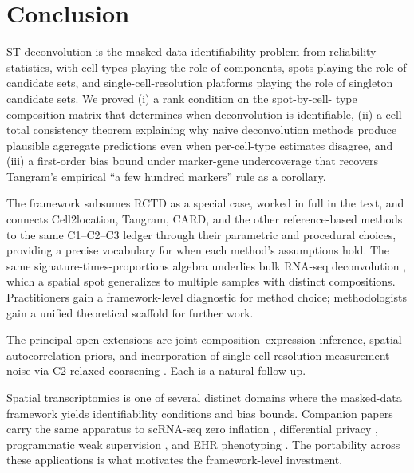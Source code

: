 \section{Conclusion}
\label{sec:conclusion}

ST deconvolution is the masked-data identifiability problem from
reliability statistics, with cell types playing the role of
components, spots playing the role of candidate sets, and
single-cell-resolution platforms playing the role of singleton
candidate sets. We proved (i) a rank condition on the spot-by-cell-
type composition matrix that determines when deconvolution is
identifiable, (ii) a cell-total consistency theorem explaining why
naive deconvolution methods produce plausible aggregate predictions
even when per-cell-type estimates disagree, and (iii) a first-order
bias bound under marker-gene undercoverage that recovers Tangram's
empirical ``a few hundred markers'' rule as a corollary.

The framework subsumes RCTD as a special case, worked in full in the
text, and connects Cell2location, Tangram, CARD, and the other
reference-based methods to the same C1--C2--C3 ledger through their
parametric and procedural choices, providing a precise vocabulary for
when each method's assumptions hold. The same signature-times-proportions
algebra underlies bulk RNA-seq deconvolution
\citep{wang2019music,newman2019digital,chu2022bayesprism}, which a
spatial spot generalizes to multiple samples with distinct
compositions. Practitioners gain a framework-level diagnostic for method
choice; methodologists gain a unified theoretical scaffold for further
work.

The principal open extensions are joint composition--expression
inference, spatial-autocorrelation priors, and incorporation of
single-cell-resolution measurement noise via C2-relaxed coarsening
\cite{towell2026mdrelax}. Each is a natural follow-up.

Spatial transcriptomics is one of several distinct domains where
the masked-data framework yields identifiability conditions and
bias bounds. Companion papers carry the same apparatus to scRNA-seq
zero inflation \cite{towell2026scrnacoarsening}, differential
privacy \cite{towell2026dpcoarsening}, programmatic weak
supervision \cite{towell2026weaksupcoarsening}, and EHR phenotyping
\cite{towell2026phenotypecoarsening}. The portability across these
applications is what motivates the framework-level investment.
